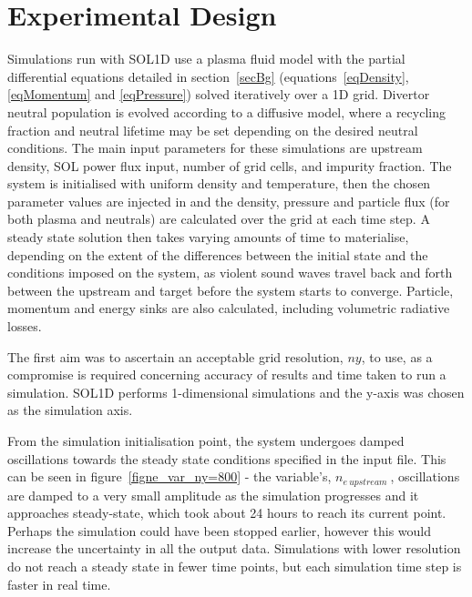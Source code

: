 \documentclass[12pt]{article}  %
\providecommand{\neupstream}{$n_{e~upstream}~$} %
\begin{document}
\section{Experimental Design}\label{secExpt}
Simulations run with SOL1D use a plasma fluid model with the partial differential equations detailed in section~\ref{secBg} (equations~\ref{eqDensity}, \ref{eqMomentum} and \ref{eqPressure}) solved iteratively over a 1D grid. Divertor neutral population is evolved according to a diffusive model, where a recycling fraction and neutral lifetime may be set depending on the desired neutral conditions. The main input parameters for these simulations are upstream density, SOL power flux input, number of grid cells, and impurity fraction. The system is initialised with uniform density and temperature, then the chosen parameter values are injected in and the density, pressure and particle flux (for both plasma and neutrals) are calculated over the grid at each time step. A steady state solution then takes varying amounts of time to materialise, depending on the extent of the differences between the initial state and the conditions imposed on the system, as violent sound waves travel back and forth between the upstream and target before the system starts to converge. Particle, momentum and energy sinks are also calculated, including volumetric radiative losses.

The first aim was to ascertain an acceptable grid resolution, $ny$, to use, as a compromise is required concerning accuracy of results and time taken to run a simulation. SOL1D performs 1-dimensional simulations and the y-axis was chosen as the simulation axis. 

From the simulation initialisation point, the system undergoes damped oscillations towards the steady state conditions specified in the input file. This can be seen in figure~\ref{figne_var_ny=800} - the variable's, \neupstream, oscillations are damped to a very small amplitude as the simulation progresses and it approaches steady-state, which took about 24 hours to reach its current point. Perhaps the simulation could have been stopped earlier, however this would increase the uncertainty in all the output data. Simulations with lower resolution do not reach a steady state in fewer time points, but each simulation time step is faster in real time.
\end{document}
